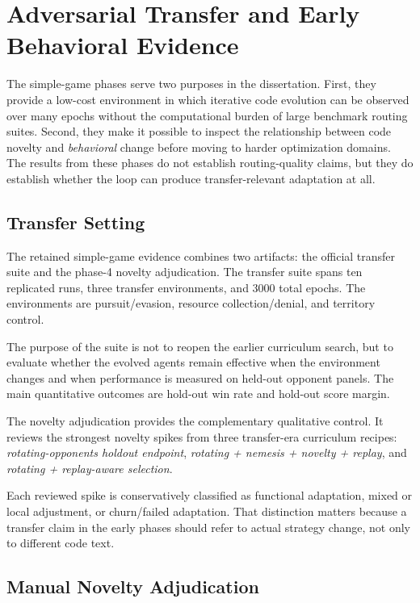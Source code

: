\chapter{Adversarial Transfer and Early Behavioral Evidence}
\label{chap:simple-games}

The simple-game phases serve two purposes in the dissertation. First, they provide a low-cost
environment in which iterative code evolution can be observed over many epochs without the
computational burden of large benchmark routing suites. Second, they make it possible to inspect
the relationship between code novelty and \emph{behavioral} change before moving to harder
optimization domains. The results from these phases do not establish routing-quality claims, but
they do establish whether the loop can produce transfer-relevant adaptation at all.

\section{Transfer Setting}
\label{sec:games-setting}

The retained simple-game evidence combines two artifacts: the official transfer suite and the
phase-4 novelty adjudication. The transfer suite spans ten replicated runs, three transfer
environments, and 3000 total epochs. The environments are pursuit/evasion, resource
collection/denial, and territory control.

The purpose of the suite is not to reopen the earlier curriculum search, but to evaluate whether
the evolved agents remain effective when the environment changes and when performance is measured
on held-out opponent panels. The main quantitative outcomes are hold-out win rate and hold-out
score margin.

The novelty adjudication provides the complementary qualitative control. It reviews the strongest
novelty spikes from three transfer-era curriculum recipes: \emph{rotating-opponents holdout
endpoint}, \emph{rotating + nemesis + novelty + replay}, and \emph{rotating + replay-aware
selection}.

Each reviewed spike is conservatively classified as functional adaptation, mixed or local
adjustment, or churn/failed adaptation. That distinction matters because a transfer claim in the
early phases should refer to actual strategy change, not only to different code text.

\section{Manual Novelty Adjudication}
\label{sec:games-novelty}

